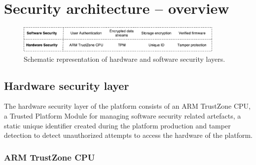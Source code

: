 \documentclass[10pt]{article}
\begin{document}
         \begin{itemize}[label={}]
         \end{itemize}

  \section{Security architecture -- overview}

    \begin{figure}[H]
      \center
      \includegraphics[width=0.9\textwidth]{input/security_layers.pdf}
      \caption{Schematic representation of hardware and software security layers.}
    \end{figure}

    \subsection{Hardware security layer}

      The hardware security layer of the platform consists of an ARM TrustZone
      CPU, a Trusted Platform Module for managing software security related
      artefacts, a static unique identifier created during the platform
      production and tamper detection to detect unauthorized attempts to
      access the hardware of the platform.

      \subsubsection{ARM TrustZone CPU}
\end{document}
